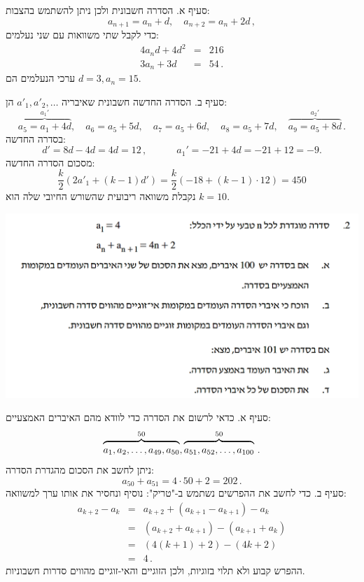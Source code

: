 \documentclass[12pt,a4paper]{article}
\begin{document}
סעיף א. הסדרה חשבונית ולכן ניתן להשתמש בהצבות:
\[
a_{n+1}=a_n+d, \quad a_{n+2}=a_n+2d\,,
\]
כדי לקבל שתי משוואות עם שני נעלמים:
\begin{eqnarray*}
4a_nd+4d^2 &=& 216\\
3a_n + 3d &=& 54\,.
\end{eqnarray*}
ערכי הנעלמים הם
$d=3,a_n=15$.

סעיף ב. הסדרה החדשה חשבונית שאיבריה 
$a'_1, a'_2,\ldots$
הן:
\[
\overbrace{a_5=a_1+4d}^{a_1'}, \quad a_6=a_5+5d,\quad  a_7=a_5+6d,\quad  a_8=a_5+7d,\quad  \overbrace{a_9=a_5+8d}^{a_2'}\,.
\]
בסדרה החדשה:
\[
d' = 8d-4d = 4d = 12\,,\quad\quad\quad a_1' = -21 + 4d= -21 + 12 = -9.
\]
מסכום הסדרה החדשה:
\[
\frac{k}{2}(2a'_1 + (k-1)d')=\frac{k}{2}(-18+(k-1)\cdot 12)=450
\]
נקבלת משוואה ריבועית שהשורש החיובי שלה הוא
$k=10$.


\bigskip

\textbf{}

\begin{center}
\includegraphics[width=.95\textwidth]{winter-2015-2}
\end{center}
\vspace{-1ex}

סעיף א. כדאי לרשום את הסדרה כדי לוודא מהם האיברים האמצעיים:
\[
\overbrace{\rule{0pt}{8pt}a_1, a_2, \ldots, a_{49}, a_{50}}^{50}, \overbrace{\rule{0pt}{8pt}a_{51}, a_{52},\ldots, a_{100}}^{50}\,.
\]
ניתן לחשב את הסכום מהגדרת הסדרה:
\[
a_{50}+a_{51}=4\cdot 50+2=202\,.
\]
סעיף ב. כדי לחשב את ההפרשים נשתמש ב-"טריק": נוסיף ונחסיר את אותו ערך למשוואה:
\begin{eqnarray*}
a_{k+2} - a_{k} &=& a_{k+2}+(a_{k+1}-a_{k+1})-a_{k}\\
&=& (a_{k+2}+a_{k+1})-(a_{k+1}+a_{k})\\
&=& (4(k+1)+2)-(4k+2)\\
&=&4\,.
\end{eqnarray*}
ההפרש קבוע ולא תלוי בזוגיות, ולכן הזוגיים והאי-זוגיים מהווים סדרות חשבוניות.
\end{document}
